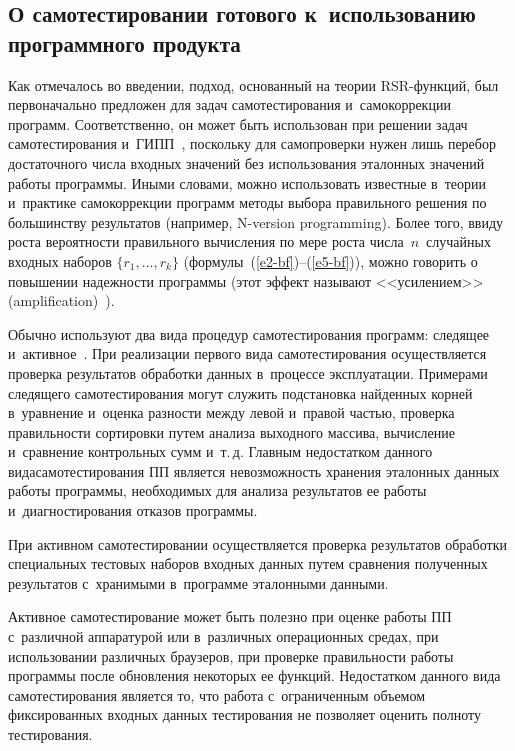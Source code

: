 \begin{multicols}{2}
\vspace*{-9pt}
    
\section{О самотестировании готового к~использованию программного продукта}

\vspace*{-3pt}

    Как отмечалось во введении, подход, основанный на теории  
RSR-функ\-ций, был первоначально предложен для задач самотестирования 
и~самокоррекции программ. Соответственно, он может быть использован 
при решении задач самотестирования и~ГИПП~\cite{12-bf}, поскольку для 
самопроверки нужен лишь перебор достаточного числа входных значений 
без использования эталонных значений работы программы. Иными словами, 
можно использовать известные в~теории и~практике самокоррекции 
программ методы выбора правильного решения по большинству результатов 
(например, N-version programming). Более того, ввиду роста вероятности 
правильного вычисления по мере роста числа~$n$~случайных входных 
наборов $\{r_1,\ldots , r_k\}$ (формулы~(\ref{e2-bf})--(\ref{e5-bf})), можно 
говорить о повышении надежности программы (этот эффект называют 
<<усилением>> (amplification)~\cite{16-bf}).
    
    Обычно используют два вида процедур са\-мо\-тес\-ти\-ро\-ва\-ния программ: 
следящее и~активное~\cite{4-bf, 17-bf}. При реализации первого вида 
самотестирования осуществляется проверка результатов обработки данных 
в~процессе эксплуатации. Примерами следящего самотестирования могут 
служить подстановка найденных корней в~уравнение и~оценка разности 
между левой и~правой частью, проверка правильности сортировки путем 
анализа выходного массива, вычисление и~сравнение контрольных\linebreak
 сумм 
и~т.\,д. Главным недостатком данного вида\linebreak самотестирования ПП является 
невозможность хранения эталонных данных работы программы, 
необходимых для анализа результатов ее работы и~диагностирования отказов 
программы.
    
    При активном самотестировании осуществляется проверка результатов 
обработки специальных тестовых наборов входных данных путем сравнения 
полученных результатов с~хранимыми в~программе эталонными данными.
    
    Активное самотестирование может быть полезно при оценке работы ПП 
с~различной аппаратурой или в~различных операционных средах, при 
использовании различных браузеров, при проверке правильности работы 
программы после обновления некоторых ее функций. Недостатком данного 
вида самотестирования является то, что работа с~ограниченным объемом 
фиксированных входных данных тестирования не позволяет оценить полноту 
тестирования.
    

\end{multicols}
